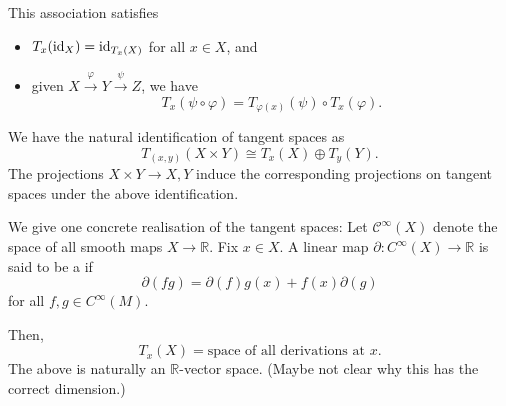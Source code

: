\documentclass[12pt]{article}
\begin{document}
This association satisfies 
\begin{itemize}
	\item $T_{x}(\operatorname{id}_{X}) = \operatorname{id}_{T_{x}(X)}$ for all $x \in X$, and
	\item given $X \xrightarrow{\varphi} Y \xrightarrow{\psi} Z$, we have
	\begin{equation*} 
		T_{x}(\psi \circ \varphi) = T_{\varphi(x)}(\psi) \circ T_{x}(\varphi).
	\end{equation*}
\end{itemize}
We have the natural identification of tangent spaces as
\begin{equation} \label{eq:tangent-space-of-product-identification}
	T_{(x, y)}(X \times Y) \cong T_{x}(X) \oplus T_{y}(Y).
\end{equation}
The projections $X \times Y \to X, Y$ induce the corresponding projections on tangent spaces under the above identification.

We give one concrete realisation of the tangent spaces: 
Let $\mathcal{C}^{\infty}(X)$ denote the space of all smooth maps $X \to \mathbb{R}$. 
Fix $x \in X$.
A linear map $\partial \colon C^{\infty}(X) \to \mathbb{R}$ is said to be a  if 
\begin{equation*} 
	\partial(fg) = \partial(f) g(x) + f(x) \partial(g)
\end{equation*}
for all $f, g \in C^{\infty}(M)$.

Then,
\begin{equation*} 
	T_{x}(X) = \text{space of all derivations at $x$}.
\end{equation*}
The above is naturally an $\mathbb{R}$-vector space. (Maybe not clear why this has the correct dimension.)
\end{document}
